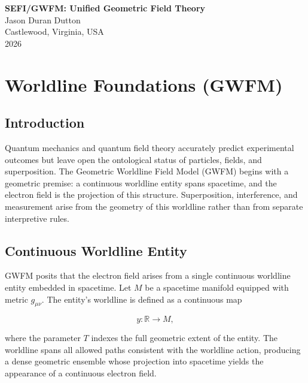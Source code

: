 \documentclass[12pt]{report}
\begin{document}
\begin{titlepage}
    \centering
    {\Large\bfseries SEFI/GWFM: Unified Geometric Field Theory}\\

    \vspace{1.5em}
    {\large Jason Duran Dutton}\\

    \vspace{0.5em}
    {\large Castlewood, Virginia, USA}\\

    \vspace{2em}
    {\large 2026}
\end{titlepage}

\tableofcontents
\newpage

\chapter{Worldline Foundations (GWFM)}

\section{Introduction}

Quantum mechanics and quantum field theory accurately predict experimental
outcomes but leave open the ontological status of particles, fields, and
superposition. The Geometric Worldline Field Model (GWFM) begins with a
geometric premise: a continuous worldline entity spans spacetime, and the
electron field is the projection of this structure. Superposition, interference,
and measurement arise from the geometry of this worldline rather than from
separate interpretive rules.

\section{Continuous Worldline Entity}

GWFM posits that the electron field arises from a single continuous worldline
entity embedded in spacetime. Let $M$ be a spacetime manifold equipped with
metric $g_{\mu\nu}$. The entity's worldline is defined as a continuous map


\[
    y : \mathbb{R} \rightarrow M,
\]


where the parameter $T$ indexes the full geometric extent of the entity. The
worldline spans all allowed paths consistent with the worldline action, producing
a dense geometric ensemble whose projection into spacetime yields the appearance
of a continuous electron field.
\end{document}
